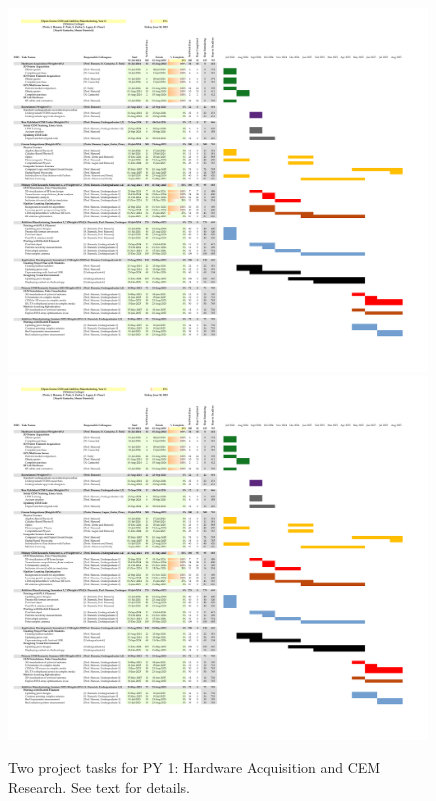 \documentclass[10pt]{amsart}
\theoremstyle{definition}
\numberwithin{equation}{section}
\begin{document}
\begin{figure}
\centering
\includegraphics[width=0.99\textwidth,trim=0.6cm 12.2cm 10.05cm 1.75cm,clip=true]{project_planning/cem_project_gantt_yr1.pdf}
\includegraphics[width=0.99\textwidth,trim=0.6cm 7.0cm 10.05cm 7.9cm,clip=true]{project_planning/cem_project_gantt_yr1.pdf}
\caption{\label{fig:gantt_1} Two project tasks for PY 1: Hardware Acquisition and CEM Research.  See text for details.}
\end{figure}
\end{document}
